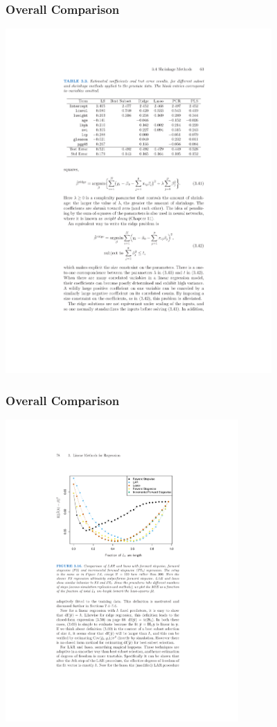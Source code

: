 \begin{frame}
\frametitle{Overall Comparison}
\begin{center}
\includegraphics[width=4in]{./resources/regressiontable}
\end{center}
\end{frame}


\begin{frame}
\frametitle{Overall Comparison}
\begin{center}
\includegraphics[width=3.5in]{./resources/compareall}
\end{center}
\end{frame}

